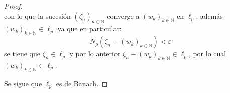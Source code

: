 \documentclass[twoside,12pt,a4 paper,openright]{book}
\begin{document}
\begin{enumerate}
\begin{proof}
\begin{equation*}
        \end{equation*}
        con lo que la sucesi\'on $\left(\zeta_n\right)_{ n\in\mathbb{N}}$ converge a $\left(w_k\right)_{ k\in\mathbb{N}}$ en $\ell_p$, adem\'as $\left(w_k\right)_{ k\in\mathbb{N}}\in\ell_p$ ya que en particular:
        \begin{equation*}
            N_p(\zeta_n-\left(w_k\right)_{ k\in\mathbb{N}})<\varepsilon
        \end{equation*}
        se tiene que $\zeta_n\in\ell_p$ y por lo anterior $\zeta_n-\left(w_k\right)_{ k\in\mathbb{N}}\in\ell_p$, por lo cual $\left(w_k\right)_{ k\in\mathbb{N}}\in\ell_p$.

        Se sigue que $\ell_p$ es de Banach.
    \end{proof}

\end{enumerate}
 








  








 
\end{document}
